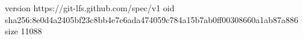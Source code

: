 version https://git-lfs.github.com/spec/v1
oid sha256:8e0d4a2405bf23c8bb4e7e6ada474059c784a15b7ab0ff00308660a1ab87a886
size 11088
